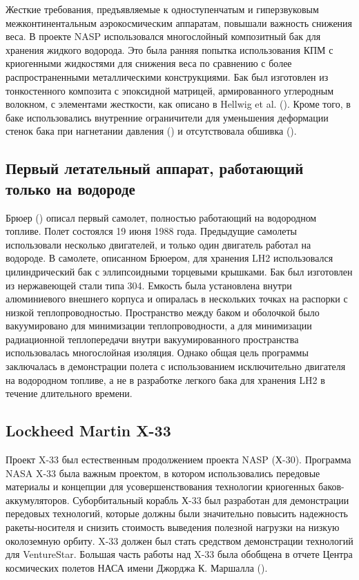 Жесткие требования, предъявляемые к одноступенчатым и гиперзвуковым межконтинентальным аэрокосмическим аппаратам, повышали важность снижения веса. В проекте NASP использовался многослойный композитный бак для хранения жидкого водорода. Это была ранняя попытка использования КПМ с криогенными жидкостями для снижения веса по сравнению с более распространенными металлическими конструкциями. Бак был изготовлен из тонкостенного композита с эпоксидной матрицей, армированного углеродным волокном, с элементами жесткости, как описано в Hellwig et al. (\cite{hellwig1992}). Кроме того, в баке использовались внутренние ограничители для уменьшения деформации стенок бака при нагнетании давления (\cite{lohmuelle2006}) и отсутствовала обшивка (\cite{robinson1994}).

\subsection{Первый летательный аппарат, работающий только на водороде}\label{ch:overview:1:sec3:sub5}

Брюер (\cite{brewer1991}) описал первый самолет, полностью работающий на водородном топливе. Полет состоялся 19 июня 1988 года. Предыдущие самолеты использовали несколько двигателей, и только один двигатель работал на водороде. В самолете, описанном Брюером, для хранения LH2 использовался цилиндрический бак с эллипсоидными торцевыми крышками. Бак был изготовлен из нержавеющей стали типа 304. Емкость была установлена внутри алюминиевого внешнего корпуса и опиралась в нескольких точках на распорки с низкой теплопроводностью. Пространство между баком и оболочкой было вакуумировано для минимизации теплопроводности, а для минимизации радиационной теплопередачи внутри вакуумированного пространства использовалась многослойная изоляция. Однако общая цель программы заключалась в демонстрации полета с использованием исключительно двигателя на водородном топливе, а не в разработке легкого бака для хранения LH2 в течение длительного времени. 

\subsection{Lockheed Martin X-33}\label{ch:overview:1:sec3:sub6}

Проект X-33 был естественным продолжением проекта NASP (Х-30). Программа NASA X-33 была важным проектом, в котором использовались передовые материалы и концепции для усовершенствования технологии криогенных баков-аккумуляторов. Суборбитальный корабль Х-33 был разработан для демонстрации передовых технологий, которые должны были значительно повысить надежность ракеты-носителя и снизить стоимость выведения полезной нагрузки на низкую околоземную орбиту. X-33 должен был стать средством демонстрации технологий для VentureStar. Большая часть работы над X-33 была обобщена в отчете Центра космических полетов НАСА имени Джорджа К. Маршалла (\cite{nasamarshall2000}).


